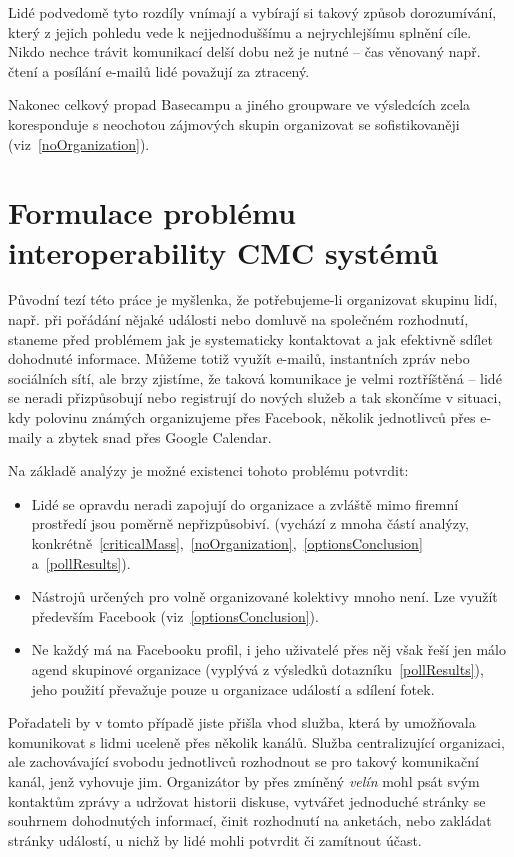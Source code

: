 \documentclass[12pt,oneside,final]{fithesis2}
\begin{document}
Lidé podvedomě tyto rozdíly vnímají a vybírají si takový způsob dorozumívání, který z jejich pohledu vede k nejjednoduššímu a nejrychlejšímu splnění cíle. Nikdo nechce trávit komunikací delší dobu než je nutné -- čas věnovaný např. čtení a posílání e-mailů lidé považují za ztracený.

Nakonec celkový propad Basecampu a jiného groupware ve výsledcích zcela koresponduje s neochotou zájmových skupin organizovat se sofistikovaněji (viz~\ref{noOrganization}).



\chapter{Formulace problému interoperability CMC systémů}\label{interoperabilityProblem}
Původní tezí této práce je myšlenka, že potřebujeme-li organizovat skupinu lidí, např. při pořádání nějaké události nebo domluvě na společném rozhodnutí, staneme před problémem jak je systematicky kontaktovat a jak efektivně sdílet dohodnuté informace. Můžeme totiž využít e-mailů, instantních zpráv nebo sociálních sítí, ale brzy zjistíme, že taková komunikace je velmi roztříštěná -- lidé se neradi přizpůsobují nebo registrují do nových služeb a tak skončíme v situaci, kdy polovinu známých organizujeme přes Facebook, několik jednotlivců přes e-maily a zbytek snad přes Google Calendar.

Na základě analýzy je možné existenci tohoto problému potvrdit:

\begin{itemize}
    \item Lidé se opravdu neradi zapojují do organizace a zvláště mimo firemní prostředí jsou poměrně nepřizpůsobiví. (vychází z mnoha částí analýzy, konkrétně~\ref{criticalMass},~\ref{noOrganization},~\ref{optionsConclusion} a~\ref{pollResults}).
    \item Nástrojů určených pro volně organizované kolektivy mnoho není. Lze využít především Facebook (viz~\ref{optionsConclusion}).
    \item Ne každý má na Facebooku profil, i jeho uživatelé přes něj však řeší jen málo agend skupinové organizace (vyplývá z výsledků dotazníku~\ref{pollResults}), jeho použití převažuje pouze u organizace událostí a sdílení fotek.
\end{itemize}

Pořadateli by v tomto případě jiste přišla vhod služba, která by u\-mož\-ňo\-va\-la komunikovat s lidmi uceleně přes několik kanálů. Služba centralizující organizaci, ale zachovávající svobodu jednotlivců rozhodnout se pro takový komunikační kanál, jenž vyhovuje jim. Organizátor by přes zmíněný \emph{velín} mohl psát svým kontaktům zprávy a udržovat historii diskuse, vytvářet jednoduché stránky se souhrnem dohodnutých informací, činit rozhodnutí na anketách, nebo zakládat stránky událostí, u nichž by lidé mohli potvrdit či zamítnout účast.
\end{document}
